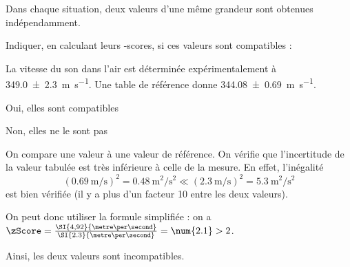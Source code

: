 
\hauteurLargeurCadreReponse		{8mm}{1.6cm}
\initialisationEntrainement


\finEntrainement

Dans chaque situation, deux valeurs d'une même grandeur sont obtenues indépendamment. 

Indiquer, en calculant leurs \zScore-scores, si ces valeurs sont compatibles :


  \begin{enonce}
  La vitesse du son dans l'air est déterminée expérimentalement à \SI{349.0\pm 2.3}{\metre\per\second}. Une table de référence donne \SI{344.08\pm 0.69}{\metre\per\second}.
  \begin{listeQCM2Colonnes}
    \item Oui, elles sont compatibles
    \item Non, elles ne le sont pas
  \end{listeQCM2Colonnes}
  \end{enonce}
  
  \reponse{\reponseB{}}
  
  \begin{corrigeNewpage}
    On compare une valeur à une valeur de référence. On vérifie que l'incertitude de la valeur tabulée est très inférieure à celle de la mesure. En effet, l'inégalité
    \[
      (\SI{0.69}{\metre\per\second})^2 = \SI{0.48}{\square\metre\per\square\second} \ll (\SI{2.3}{\metre\per\second})^2 =   \SI{5.3}{\square\metre\per\square\second}
    \]
    est bien vérifiée (il y a plus d'un facteur 10 entre les deux valeurs).
    
    On peut donc utiliser la formule simplifiée : on a \(\zScore=\frac{\SI{4,92}{\metre\per\second}}{\SI{2.3}{\metre\per\second}}=\num{2.1}>2\).
    
    Ainsi, les deux valeurs sont incompatibles.
  \end{corrigeNewpage}
  
